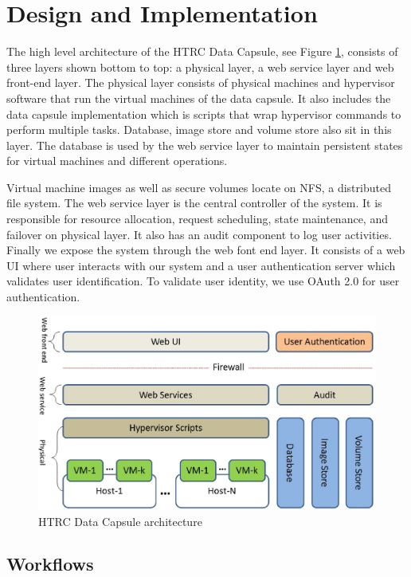 \documentclass{acm_proc_article-sp}
\begin{document}
\section{Design and Implementation} \label{title:design}

 The high level architecture of the HTRC Data Capsule, see Figure \ref{fig:architecture}, consists of three layers shown bottom to top: a physical layer, a web service layer and web front-end layer. The physical layer consists of physical machines and hypervisor software that run the virtual machines of the data capsule. It also includes the data capsule implementation which is scripts that wrap hypervisor commands to perform multiple tasks. Database, image store and volume store also sit in this layer. The database is used by the web service layer to maintain persistent states for virtual machines and different operations.

Virtual machine images as well as secure volumes locate on NFS, a distributed file system. The web service layer is the central controller of the system. It is responsible for resource allocation, request scheduling, state maintenance, and failover on physical layer. It also has an audit component to log user activities. Finally we expose the system through the web font end layer. It consists of a web UI where user interacts with our system and a user authentication server which validates user identification. To validate user identity, we use OAuth 2.0 \cite{OAuth2} for user authentication.

\begin{figure}[ht]
  \centering
  \includegraphics[scale=0.33]{figures/layers}
  \caption{HTRC Data Capsule architecture}
  \label{fig:architecture}
\end{figure}


\subsection{Workflows}
\end{document}
